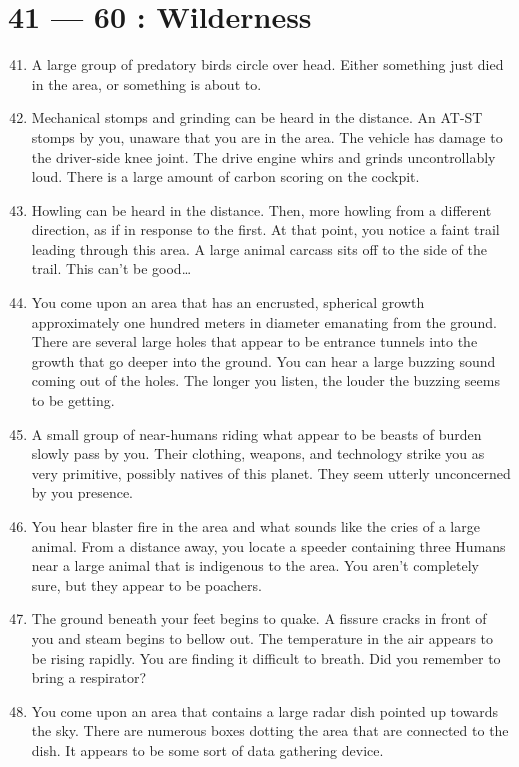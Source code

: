 \documentclass{article}
\begin{document}
\section*{41 --- 60 : Wilderness}
\begin{enumerate}
	\setcounter{enumi}{40}
	\item A large group of predatory birds circle over head. Either something just died in the area, or something is about to.
	\item Mechanical stomps and grinding can be heard in the distance. An AT-ST stomps by you, unaware that you are in the area. The vehicle has damage to the driver-side knee joint. The drive engine whirs and grinds uncontrollably loud. There is a large amount of carbon scoring on the cockpit.
	\item Howling can be heard in the distance. Then, more howling from a different direction, as if in response to the first. At that point, you notice a faint trail leading through this area. A large animal carcass sits off to the side of the trail. This can’t be good…
	\item You come upon an area that has an encrusted, spherical growth approximately one hundred meters in diameter emanating from the ground. There are several large holes that appear to be entrance tunnels into the growth that go deeper into the ground. You can hear a large buzzing sound coming out of the holes. The longer you listen, the louder the buzzing seems to be getting.
	\item A small group of near-humans riding what appear to be beasts of burden slowly pass by you. Their clothing, weapons, and technology strike you as very primitive, possibly natives of this planet. They seem utterly unconcerned by you presence.
	\item You hear blaster fire in the area and what sounds like the cries of a large animal. From a distance away, you locate a speeder containing three Humans near a large animal that is indigenous to the area. You aren’t completely sure, but they appear to be poachers.
	\item The ground beneath your feet begins to quake. A fissure cracks in front of you and steam begins to bellow out. The temperature in the air appears to be rising rapidly. You are finding it difficult to breath. Did you remember to bring a respirator?
	\item You come upon an area that contains a large radar dish pointed up towards the sky. There are numerous boxes dotting the area that are connected to the dish. It appears to be some sort of data gathering device.

\end{enumerate}
\end{document}
